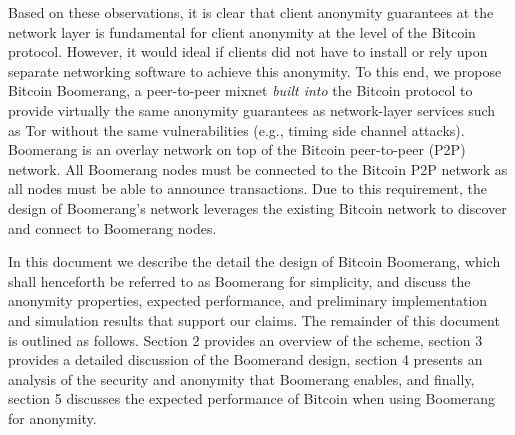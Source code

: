 Based on these observations, it is clear that client anonymity guarantees at the network layer is fundamental for client anonymity at the level of the Bitcoin protocol. However, it would ideal if clients did not have to install or rely upon separate networking software to achieve this anonymity. To this end, we propose Bitcoin Boomerang, a peer-to-peer mixnet \emph{built into} the Bitcoin protocol to provide virtually the same anonymity guarantees as network-layer services such as Tor without the same vulnerabilities (e.g., timing side channel attacks). Boomerang is an overlay network on top of the Bitcoin peer-to-peer (P2P) network. All Boomerang nodes must be connected to the Bitcoin P2P network as all nodes must be able to announce transactions. Due to this requirement, the design of Boomerang’s network leverages the existing Bitcoin network to discover and connect to Boomerang nodes.

In this document we describe the detail the design of Bitcoin Boomerang, which shall henceforth be referred to as Boomerang for simplicity, and discuss the anonymity properties, expected performance, and preliminary implementation and simulation results that support our claims. The remainder of this document is outlined as follows. Section 2 provides an overview of the scheme, section 3 provides a detailed discussion of the Boomerand design, section 4 presents an analysis of the security and anonymity that Boomerang enables, and finally, section 5 discusses the expected performance of Bitcoin when using Boomerang for anonymity. 




